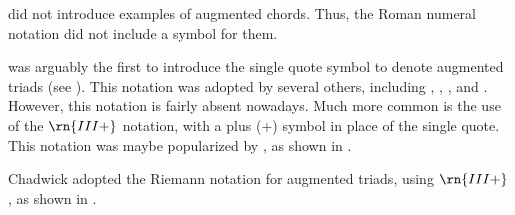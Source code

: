 \textcite{weber1817versuch} did not introduce examples of
augmented chords. Thus, the Roman numeral notation did not
include a symbol for them. 

\textcite{richter1860lehrbuch} was arguably the first to
introduce the single quote symbol to denote augmented triads
(see ). This
notation was adopted by several others, including
\textcite{jadassohn1883lehrbuch},
\textcite{broekhoven1889system}, \textcite{buwa1893schule},
and \textcite{shepard1896harmony}. However, this notation is
fairly absent nowadays. Much more common is the use of the
$\rn{III+}$ notation, with a plus ($+$) symbol in place of
the single quote. This notation was maybe popularized by
\textcite{riemann1890katechismus}, as shown in
.





Chadwick adopted the Riemann notation for augmented triads,
using $\rn{III+}$, as shown in
.  